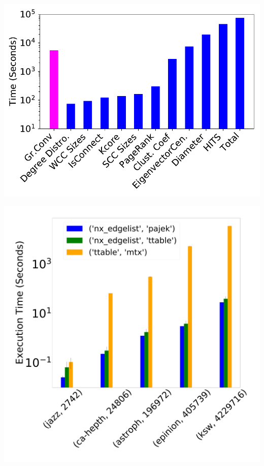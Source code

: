 \documentclass[landscape,paperwidth=70in,paperheight=46in,fontscale=0.225]{baposter} %
\begin{document}
\begin{poster}
{\hfill
\begin{minipage}{0.45\linewidth}
\includegraphics[scale=0.27]{figures/g4_timing.pdf} 
\end{minipage}
\hfill
\begin{minipage}{0.45\linewidth}
\includegraphics[scale=0.038]{figures/scatter_bar_to_ttable.pdf}
\end{minipage}

}



\end{poster}
\end{document}
